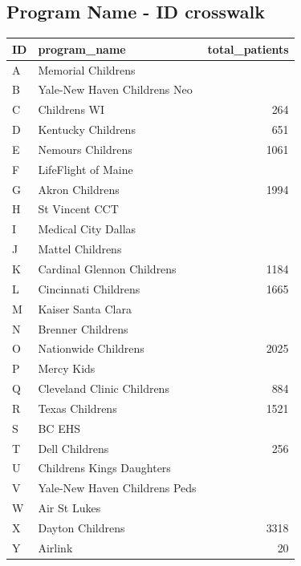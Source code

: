 \documentclass[twoside]{article}\usepackage[]{graphicx}\usepackage[]{color}
\begin{document}
\subsection*{Program Name - ID crosswalk}
\begin{table}[ht]
\centering
\begin{tabular}{llr}
  \hline
ID & program\_name & total\_patients \\ 
  \hline
A & Memorial Childrens &  \\ 
  B & Yale-New Haven Childrens Neo &  \\ 
  C & Childrens WI & 264 \\ 
  D & Kentucky Childrens & 651 \\ 
  E & Nemours Childrens & 1061 \\ 
  F & LifeFlight of Maine &  \\ 
  G & Akron Childrens & 1994 \\ 
  H & St Vincent CCT &  \\ 
  I & Medical City Dallas &  \\ 
  J & Mattel Childrens &  \\ 
  K & Cardinal Glennon Childrens & 1184 \\ 
  L & Cincinnati Childrens & 1665 \\ 
  M & Kaiser Santa Clara &  \\ 
  N & Brenner Childrens &  \\ 
  O & Nationwide Childrens & 2025 \\ 
  P & Mercy Kids &  \\ 
  Q & Cleveland Clinic Childrens & 884 \\ 
  R & Texas Childrens & 1521 \\ 
  S & BC EHS &  \\ 
  T & Dell Childrens & 256 \\ 
  U & Childrens Kings Daughters &  \\ 
  V & Yale-New Haven Childrens Peds &  \\ 
  W & Air St Lukes &  \\ 
  X & Dayton Childrens & 3318 \\ 
  Y & Airlink & 20 \\ 
   \hline
\end{tabular}
\end{table}






\end{document}
